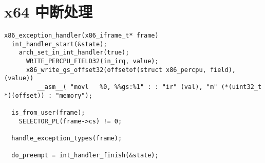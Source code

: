 \section{x64 中断处理}
\begin{verbatim}
x86_exception_handler(x86_iframe_t* frame)
  int_handler_start(&state);
    arch_set_in_int_handler(true);
      WRITE_PERCPU_FIELD32(in_irq, value);
      x86_write_gs_offset32(offsetof(struct x86_percpu, field), (value))
         __asm__( "movl   %0, %%gs:%1" : : "ir" (val), "m" (*(uint32_t *)(offset)) : "memory");

  is_from_user(frame);
    SELECTOR_PL(frame->cs) != 0;

  handle_exception_types(frame);

  do_preempt = int_handler_finish(&state);



\end{verbatim}